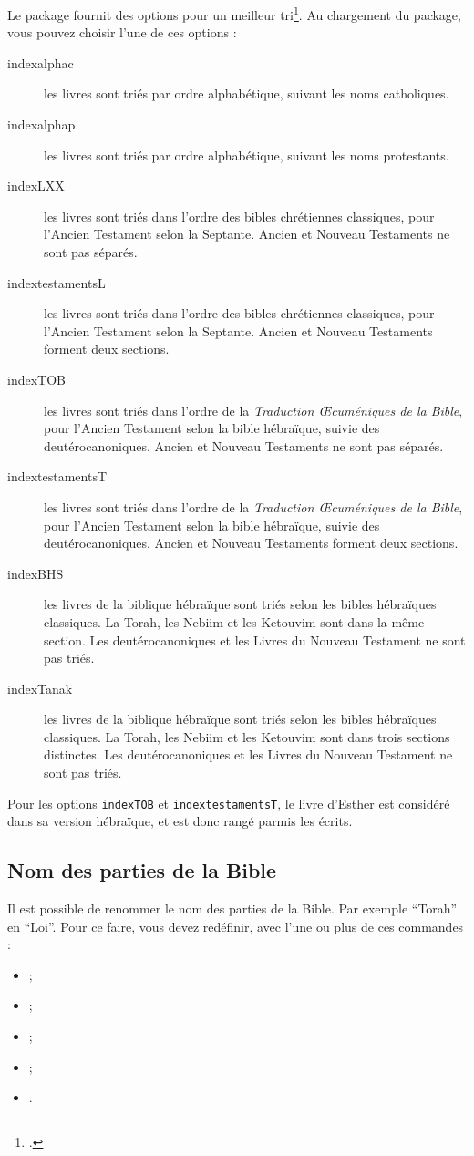 \documentclass{ltxdoc}
\begin{document}
Le package fournit des options pour un meilleur tri\footcite[Pour l'Ancien Testament les protestants suivent le canon juif pour son contenu mais utilisent l'ordre du canon catholique, voir][]{canons}. Au chargement du package, vous pouvez choisir l'une de ces options :
 \begin{description}
 \item[indexalphac]les livres sont triés par ordre alphabétique, suivant les noms catholiques.
\item[indexalphap]les livres sont triés par ordre alphabétique, suivant les noms protestants.
\item[indexLXX]les livres sont triés dans l'ordre des bibles chrétiennes classiques, pour l'Ancien Testament  selon la Septante. Ancien et Nouveau Testaments ne sont pas séparés.
\item[indextestamentsL]les livres sont triés dans l'ordre des bibles chrétiennes classiques, pour l'Ancien Testament  selon la Septante. Ancien et Nouveau Testaments forment deux sections.
\item[indexTOB]les livres sont triés dans l'ordre de la \emph{Traduction Œcuméniques de la Bible}, pour l'Ancien Testament  selon la bible hébraïque, suivie des deutérocanoniques. Ancien et Nouveau Testaments ne sont pas séparés.
\item[indextestamentsT]les livres sont triés dans l'ordre de la \emph{Traduction Œcuméniques de la Bible}, pour l'Ancien Testament  selon la bible hébraïque, suivie des deutérocanoniques. Ancien et Nouveau Testaments forment deux sections.
\item[indexBHS]les livres de la biblique hébraïque sont triés selon les bibles hébraïques classiques. La Torah, les Nebiim et les Ketouvim sont dans la même section. Les deutérocanoniques et les Livres du Nouveau Testament ne sont pas triés.
\item[indexTanak]les livres de la biblique hébraïque sont triés selon les bibles hébraïques classiques. La Torah, les Nebiim et les Ketouvim sont dans trois sections distinctes. Les deutérocanoniques et les Livres du Nouveau Testament ne sont pas triés.
\end{description}

Pour les options \verb|indexTOB| et \verb|indextestamentsT|, le livre d'Esther est considéré dans sa version hébraïque, et est donc rangé parmis les  écrits.
\subsection{Nom des parties de la Bible}
Il est possible de renommer le nom des parties de la Bible. Par exemple \enquote{Torah} en \enquote{Loi}.
Pour ce faire, vous devez redéfinir, avec   l'une ou plus de ces commandes :
 \begin{itemize}
 \item {} ;
 \item {} ;
 \item {} ;
 \item {};
 \item {}.
\end{itemize}
\end{document}
